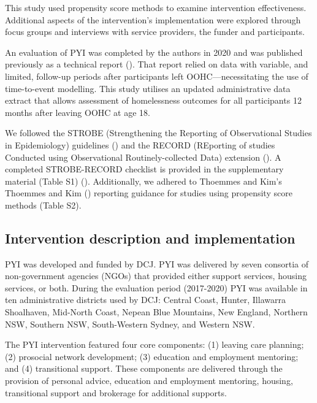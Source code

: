 \documentclass[
  jou,
  floatsintext,
  longtable,
  nolmodern,
  notxfonts,
  notimes,
  colorlinks=true,linkcolor=blue,citecolor=blue,urlcolor=blue]{apa7}
\begin{document}
This study used propensity score methods to examine intervention
effectiveness. Additional aspects of the intervention's implementation
were explored through focus groups and interviews with service
providers, the funder and participants.

An evaluation of PYI was completed by the authors in 2020 and was
published previously as a technical report
().
That report relied on data with variable, and limited, follow-up periods
after participants left OOHC---necessitating the use of time-to-event
modelling. This study utilises an updated administrative data extract
that allows assessment of homelessness outcomes for all participants 12
months after leaving OOHC at age 18.

We followed the STROBE (Strengthening the Reporting of Observational
Studies in Epidemiology) guidelines
() and the RECORD (REporting of studies Conducted using
Observational Routinely-collected Data) extension
(). A completed STROBE-RECORD checklist is provided in the
supplementary material (Table S1)
(). Additionally, we adhered to Thoemmes
and Kim's Thoemmes and Kim
() reporting
guidance for studies using propensity score methods (Table S2).

\subsection{Intervention description and
implementation}\label{intervention-description-and-implementation}

PYI was developed and funded by DCJ. PYI was delivered by seven
consortia of non-government agencies (NGOs) that provided either support
services, housing services, or both. During the evaluation period
(2017-2020) PYI was available in ten administrative districts used by
DCJ: Central Coast, Hunter, Illawarra Shoalhaven, Mid-North Coast,
Nepean Blue Mountains, New England, Northern NSW, Southern NSW,
South-Western Sydney, and Western NSW.

The PYI intervention featured four core components: (1) leaving care
planning; (2) prosocial network development; (3) education and
employment mentoring; and (4) transitional support. These components are
delivered through the provision of personal advice, education and
employment mentoring, housing, transitional support and brokerage for
additional supports.
\end{document}
